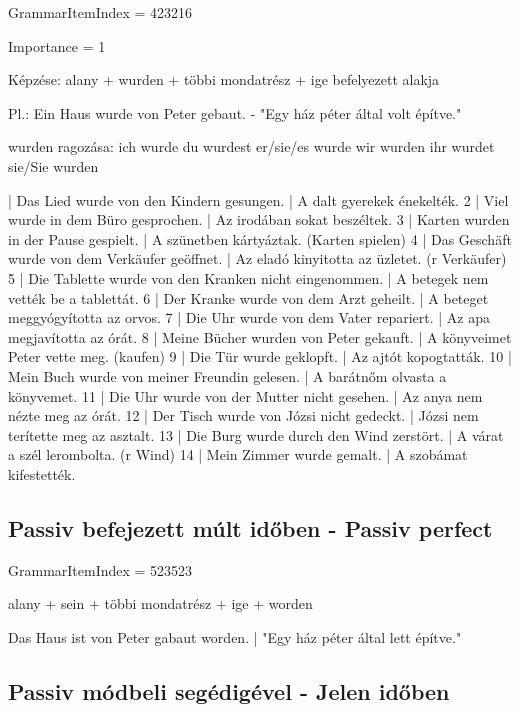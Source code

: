 \documentclass{article}
\newenvironment{desc}{\verbatim}{\endverbatim}
\newenvironment{exmp}{\verbatim}{\endverbatim}
\begin{document}
GrammarItemIndex = 423216

Importance = 1

\begin{desc}
Képzése: alany + wurden + többi mondatrész + ige befelyezett alakja

Pl.: Ein Haus wurde von Peter gebaut. - "Egy ház péter által volt építve."

wurden ragozása:
ich wurde
du wurdest
er/sie/es wurde
wir wurden
ihr wurdet
sie/Sie wurden
\end{desc}

\begin{exmp}
1 | Das Lied wurde von den Kindern gesungen. | A dalt gyerekek énekelték.
2 | Viel wurde in dem Büro gesprochen. | Az irodában sokat beszéltek.
3 | Karten wurden in der Pause gespielt. | A szünetben kártyáztak. (Karten spielen)
4 | Das Geschäft wurde von dem Verkäufer geöffnet. | Az eladó kinyitotta az üzletet. (r Verkäufer)
5 | Die Tablette wurde von den Kranken nicht eingenommen. | A betegek nem vették be a tablettát.
6 | Der Kranke wurde von dem Arzt geheilt. | A beteget meggyógyította az orvos.
7 | Die Uhr wurde von dem Vater repariert. | Az apa megjavította az órát.
8 | Meine Bücher wurden von Peter gekauft. | A könyveimet Peter vette meg. (kaufen)
9 | Die Tür wurde geklopft. | Az ajtót kopogtatták.
10 | Mein Buch wurde von meiner Freundin gelesen. | A barátnőm olvasta a könyvemet.
11 | Die Uhr wurde von der Mutter nicht gesehen. | Az anya nem nézte meg az órát.
12 | Der Tisch wurde von Józsi nicht gedeckt. | Józsi nem terítette meg az asztalt.
13 | Die Burg wurde durch den Wind zerstört. | A várat a szél lerombolta. (r Wind)
14 | Mein Zimmer wurde gemalt. | A szobámat kifestették.
\end{exmp}

\subsection{Passiv befejezett múlt időben - Passiv perfect}

GrammarItemIndex = 523523

\begin{desc}
alany + sein + többi mondatrész + ige + worden

Das Haus ist von Peter gabaut worden. | "Egy ház péter által lett építve."
\end{desc}

\subsection{Passiv módbeli segédigével - Jelen időben}
\end{document}
